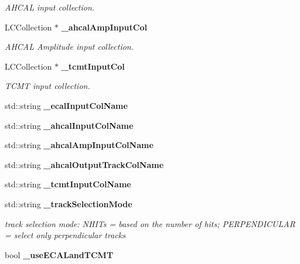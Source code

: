 \begin{DoxyCompactItemize}
\begin{DoxyCompactList}\small\item\em AHCAL input collection. \item\end{DoxyCompactList}\item 
LCCollection $\ast$ {\bf \_\-ahcalAmpInputCol}\label{classCALICE_1_1MipTrackFinder_a60d1306464699c01c609abc7f8edddaa}

\begin{DoxyCompactList}\small\item\em AHCAL Amplitude input collection. \item\end{DoxyCompactList}\item 
LCCollection $\ast$ {\bf \_\-tcmtInputCol}\label{classCALICE_1_1MipTrackFinder_a3e4410c59519f6a9ba69aa07983ebeb0}

\begin{DoxyCompactList}\small\item\em TCMT input collection. \item\end{DoxyCompactList}\item 
std::string {\bfseries \_\-ecalInputColName}\label{classCALICE_1_1MipTrackFinder_aede8ca5f1ff5926b465b427f1e4f9a97}

\item 
std::string {\bfseries \_\-ahcalInputColName}\label{classCALICE_1_1MipTrackFinder_ae71300eb7bcb4d10522c49cba491b995}

\item 
std::string {\bfseries \_\-ahcalAmpInputColName}\label{classCALICE_1_1MipTrackFinder_a2e88acac7e2cfa5be020b3fbe9448442}

\item 
std::string {\bfseries \_\-ahcalOutputTrackColName}\label{classCALICE_1_1MipTrackFinder_a514a9e8135b991d26fda0df6cb4e5740}

\item 
std::string {\bfseries \_\-tcmtInputColName}\label{classCALICE_1_1MipTrackFinder_a4f087086c49cb3721e512d68c1eac320}

\item 
std::string {\bf \_\-trackSelectionMode}\label{classCALICE_1_1MipTrackFinder_a6e6e7284cd571e5c093b69ee1a253ae7}

\begin{DoxyCompactList}\small\item\em track selection mode: NHITs = based on the number of hits; PERPENDICULAR = select only perpendicular tracks \item\end{DoxyCompactList}\item 
bool {\bf \_\-useECALandTCMT}\label{classCALICE_1_1MipTrackFinder_ab0c70fcc6c54979eb0a24466fc667912}


\end{DoxyCompactItemize}
